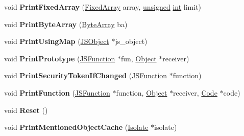 \begin{DoxyCompactItemize}
\item 
\mbox{\label{classv8_1_1internal_1_1StringStream_a3fbfdfe36261fdf9fb43e8e735763d5e}} 
void {\bfseries Print\+Fixed\+Array} (\mbox{\hyperlink{classv8_1_1internal_1_1FixedArray}{Fixed\+Array}} array, \mbox{\hyperlink{classunsigned}{unsigned}} \mbox{\hyperlink{classint}{int}} limit)
\item 
\mbox{\label{classv8_1_1internal_1_1StringStream_aec3f4088a23cb7acf1660f94d452e44e}} 
void {\bfseries Print\+Byte\+Array} (\mbox{\hyperlink{classv8_1_1internal_1_1ByteArray}{Byte\+Array}} ba)
\item 
\mbox{\label{classv8_1_1internal_1_1StringStream_a18dafcb71cb03dfab099345894be47f4}} 
void {\bfseries Print\+Using\+Map} (\mbox{\hyperlink{classv8_1_1internal_1_1JSObject}{J\+S\+Object}} $\ast$js\+\_\+object)
\item 
\mbox{\label{classv8_1_1internal_1_1StringStream_afb484ceb6ccf40f9d9194bfdb68edd4e}} 
void {\bfseries Print\+Prototype} (\mbox{\hyperlink{classv8_1_1internal_1_1JSFunction}{J\+S\+Function}} $\ast$fun, \mbox{\hyperlink{classv8_1_1internal_1_1Object}{Object}} $\ast$receiver)
\item 
\mbox{\label{classv8_1_1internal_1_1StringStream_a5cfc02c8e9a0be50c769b0bd92e7ba92}} 
void {\bfseries Print\+Security\+Token\+If\+Changed} (\mbox{\hyperlink{classv8_1_1internal_1_1JSFunction}{J\+S\+Function}} $\ast$function)
\item 
\mbox{\label{classv8_1_1internal_1_1StringStream_a5fa04e64fdb917d0bb34e7ef74c54b6a}} 
void {\bfseries Print\+Function} (\mbox{\hyperlink{classv8_1_1internal_1_1JSFunction}{J\+S\+Function}} $\ast$function, \mbox{\hyperlink{classv8_1_1internal_1_1Object}{Object}} $\ast$receiver, \mbox{\hyperlink{classv8_1_1internal_1_1Code}{Code}} $\ast$code)
\item 
\mbox{\label{classv8_1_1internal_1_1StringStream_ac124b401d3e5678944c1377ee936f8d0}} 
void {\bfseries Reset} ()
\item 
\mbox{\label{classv8_1_1internal_1_1StringStream_a623085f254cf314be127bdd1e23641a7}} 
void {\bfseries Print\+Mentioned\+Object\+Cache} (\mbox{\hyperlink{classv8_1_1internal_1_1Isolate}{Isolate}} $\ast$isolate)
\end{DoxyCompactItemize}
